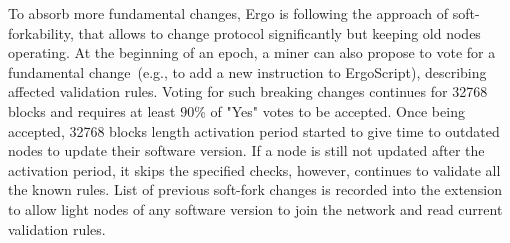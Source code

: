 To absorb more fundamental changes, Ergo is following the approach of soft-forkability, that
allows to change protocol significantly but keeping old nodes operating.
At the beginning of an epoch, a miner can also propose to vote for a fundamental change~(e.g., to add a new instruction to ErgoScript), describing affected validation rules.
Voting for such breaking changes continues for 32768 blocks and requires at least $90\%$ of
"Yes" votes to be accepted.
Once being accepted, 32768 blocks length activation period started to give time to outdated
nodes to update their software version.
If a node is still not updated after the activation period, it skips the specified checks,
however, continues to validate all the known rules.
List of previous soft-fork changes is recorded into the extension to allow light nodes of
any software version to join the network and read current validation rules.